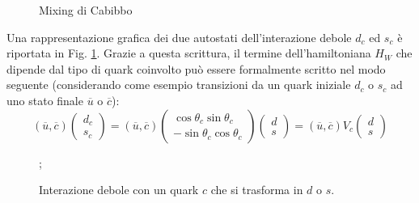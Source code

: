 \documentclass{subnucbo}
\begin{document}
\begin{figure}[t]
        \centering
        \caption{Mixing di Cabibbo}
        \label{fig:sdmixing}
\end{figure}
Una rappresentazione grafica dei due autostati dell'interazione debole $d_{c}$ ed $s_{c}$ è riportata in Fig. \ref{fig:sdmixing}. Grazie a questa scrittura, il termine dell'hamiltoniana $H_{W}$ che dipende dal tipo di quark coinvolto può essere formalmente scritto nel modo seguente (considerando come esempio transizioni da un quark iniziale $d_{c}$ o $s_{c}$ ad uno stato finale $\overline{u}$ o $\overline{c}$):
\begin{equation}
        ( \overline { u } , \overline { c } ) \left( \begin{array} { c } { d _ { c } } \\ { s _ { c } } \end{array} \right) = ( \overline { u } , \overline { c } ) \left( \begin{array} { c } { \operatorname { c o s } \theta _ { c } \operatorname { s i n } \theta _ { c } } \\ { - \operatorname { s i n } \theta _ { c } \operatorname { c o s } \theta _ { c } } \end{array} \right) \left( \begin{array} { l } { d } \\ { s } \end{array} \right) = ( \overline { u } , \overline { c } ) V _ { c } \left( \begin{array} { l } { d } \\ { s } \end{array} \right)
\end{equation}

\begin{figure}[!h]
        \centering
        ;
        \caption{Interazione debole con un quark $c$ che si trasforma in $d$ o $s$.}
        \label{fig:gim_decay}
\end{figure}
\end{document}
